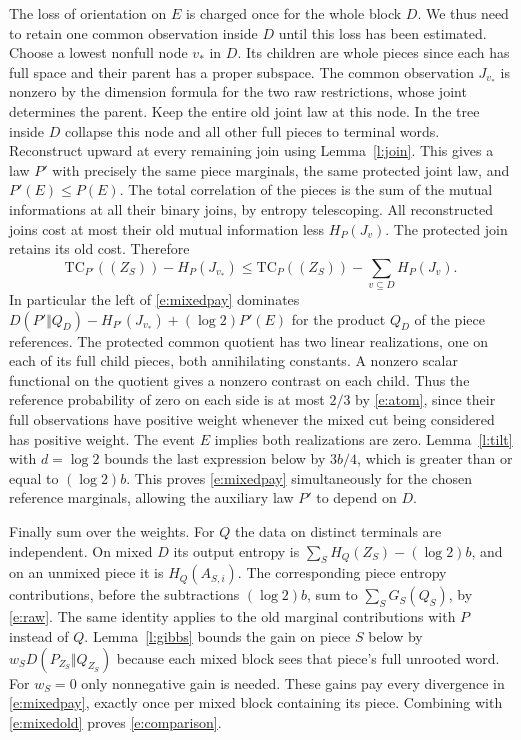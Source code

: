 \documentclass[11pt]{article}
\numberwithin{equation}{section}
\begin{document}
The loss of orientation on $E$ is charged once for the whole block
$D$. We thus need to retain one common observation inside $D$
until this loss has been estimated. Choose a lowest nonfull node
$v_*$ in $D$. Its children are
whole pieces since each has full space and their parent has a proper subspace.
The common observation $J_{v_*}$ is nonzero by the dimension
formula for the two raw restrictions, whose joint determines
the parent. Keep the entire old joint law at this node. In the
tree inside $D$ collapse this node and all other full pieces to
terminal words. Reconstruct upward at every remaining join using
Lemma~\ref{l:join}. This gives a law $P'$ with precisely the
same piece marginals, the same protected joint law, and
$P'(E)\le P(E)$. The total correlation of the pieces is the sum
of the mutual informations at all their binary joins, by entropy
telescoping. All reconstructed joins cost at most their old mutual
information less $H_P(J_v)$. The protected join retains its old cost.
Therefore
\[
  \mathrm{TC}_{P'}((Z_S))-H_P(J_{v_*})\le
  \mathrm{TC}_P((Z_S))-\sum_{v\subseteq D}H_P(J_v).
\]
In particular the left of \eqref{e:mixedpay} dominates
$D(P'\Vert Q_D)-H_{P'}(J_{v_*})+(\log2)P'(E)$ for the product
$Q_D$ of the piece references. The protected common quotient has
two linear realizations, one on each of its full child pieces,
both annihilating constants. A nonzero scalar functional on
the quotient gives a nonzero contrast on each child. Thus the
reference probability of zero on each side is at most $2/3$
by \eqref{e:atom}, since their full observations have positive weight
whenever the mixed cut being considered has positive weight.
The event $E$ implies both realizations are zero. Lemma~\ref{l:tilt}
with $d=\log2$ bounds the last expression below by $3b/4$,
which is greater than or equal to $(\log2)b$. This proves
\eqref{e:mixedpay} simultaneously for the chosen reference
marginals, allowing the auxiliary law $P'$ to depend on $D$.

Finally sum over the weights. For $Q$ the data on distinct
terminals are independent. On mixed $D$ its output entropy is
$\sum_S H_Q(Z_S)-(\log2)b$, and on an unmixed piece it is
$H_Q(A_{S,i})$. The corresponding piece entropy contributions,
before the subtractions $(\log2)b$, sum to $\sum_S G_S(Q_S)$,
by \eqref{e:raw}. The same identity applies to the old marginal
contributions with $P$ instead of $Q$. Lemma~\ref{l:gibbs}
bounds the gain on piece $S$ below by $w_S D(P_{Z_S}\Vert Q_{Z_S})$
because each mixed block sees that piece's full unrooted word.
For $w_S=0$ only nonnegative gain is needed. These gains pay
every divergence in \eqref{e:mixedpay}, exactly once per mixed
block containing its piece. Combining with \eqref{e:mixedold}
proves \eqref{e:comparison}.
\end{document}
